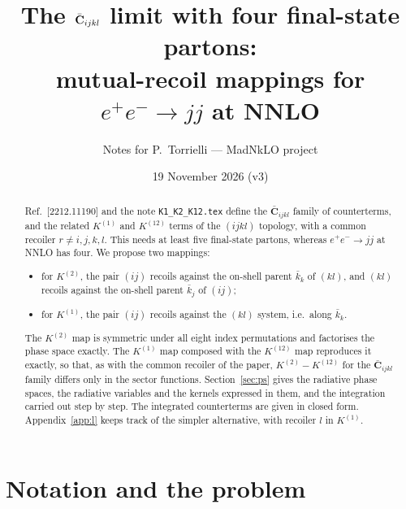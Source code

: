 \documentclass[11pt,a4paper]{article}
\title{The $\bbC{ijkl}$ limit with four final-state partons:\\
mutual-recoil mappings for $e^+e^-\to jj$ at NNLO}
\author{Notes for P.~Torrielli --- MadNkLO project}
\date{19 November 2026 (v3)}
\newcommand{\bbC}[1]{\bar{\mathbf C}_{#1}}
\newcommand{\jb}{\bar k_{j}}
\newcommand{\kb}{\bar k_{k}}
\begin{document}
\maketitle

\begin{abstract}
Ref.~[2212.11190] and the note \texttt{K1\_K2\_K12.tex} define the
$\bbC{ijkl}$ family of counterterms, and the related $K^{(1)}$ and $K^{(12)}$ terms of the
$(ijkl)$ topology, with a common recoiler $r\neq i,j,k,l$. This needs at least five
final-state partons, whereas $e^+e^-\to jj$ at NNLO has four.
We propose two mappings:
\begin{itemize}
\item for $K^{(2)}$, the pair $(ij)$ recoils against the on-shell parent $\kb$ of $(kl)$, and $(kl)$ recoils against the
on-shell parent $\jb$ of $(ij)$;
\item for $K^{(1)}$, the pair $(ij)$ recoils against the $(kl)$ system, i.e.\ along $\kb$.
\end{itemize}
The $K^{(2)}$ map is symmetric under all eight index permutations and factorises the
phase space exactly. The $K^{(1)}$ map composed with the $K^{(12)}$ map reproduces it
exactly, so that, as with the common recoiler of the paper, $K^{(2)}-K^{(12)}$ for the
$\bbC{ijkl}$ family differs only in the sector functions. Section~\ref{sec:ps} gives the radiative phase spaces, the
radiative variables and the kernels expressed in them, and the integration carried out step by step.
The integrated counterterms are given in closed form. Appendix~\ref{app:l} keeps track of the simpler alternative,
with recoiler $l$ in $K^{(1)}$.
\end{abstract}

\tableofcontents

\section{Notation and the problem}
\label{sec:problem}
\end{document}
